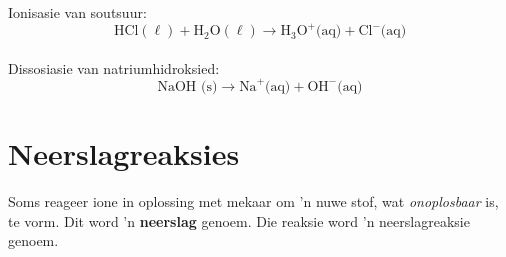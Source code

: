 Ionisasie van soutsuur:\\
        \label{m38720*id339770}\nopagebreak\noindent          
    \begin{equation*}
    \text{HCl} (\ell)  +{\text{H}}_{2}\text{O} (\ell) \to {\text{H}}_{3}{\text{O}}^{+} \text{(aq)} +{\text{Cl}}^{-} \text{(aq)}
      \end{equation*}\\
        \label{m38720*id339831}\nopagebreak\noindent
Dissosiasie van natriumhidroksied:\\          
    \begin{equation*}
    \text{NaOH (s)} \to {\text{Na}}^{+} \text{(aq)} + {\text{OH}}^{-} \text{(aq)}
      \end{equation*}
 \par 
\label{m38720**end}
            \section{Neerslagreaksies}
            \nopagebreak
Soms reageer ione in oplossing met mekaar om  'n nuwe stof, wat \textsl{onoplosbaar} is, te vorm. Dit word  'n \textbf{neerslag} genoem. Die reaksie word  'n neerslagreaksie genoem.\par 



